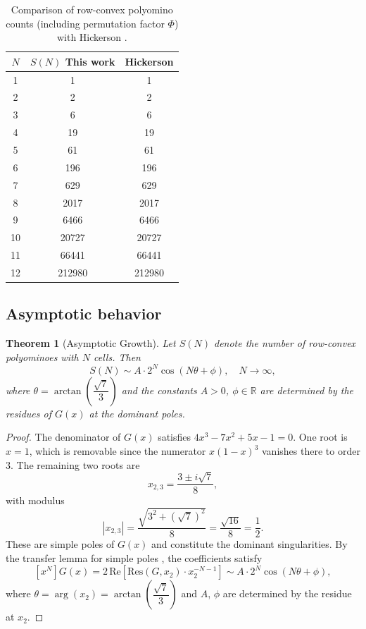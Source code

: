 \documentclass{article}
\theoremstyle{definition}
\theoremstyle{plain}
\newtheorem{theorem}{Theorem}[section]
\begin{document}
\begin{table}[h!]
\centering
\begin{tabular}{c|c|c}
$N$ & $S(N)$ This work & Hickerson \cite{hickerson1999counting} \\
\hline
1  & 1      & 1      \\
2  & 2      & 2      \\
3  & 6      & 6      \\
4  & 19     & 19     \\
5  & 61     & 61     \\
6  & 196    & 196    \\
7  & 629    & 629    \\
8  & 2017   & 2017   \\
9  & 6466   & 6466   \\
10 & 20727  & 20727  \\
11 & 66441  & 66441  \\
12 & 212980 & 212980 \\
\end{tabular}
\caption{Comparison of row-convex polyomino counts (including permutation 
factor $\Phi$) with Hickerson \cite{hickerson1999counting}.}
\label{tab:comparison}
\end{table}

\subsection{Asymptotic behavior}

\begin{theorem}[Asymptotic Growth]
\label{thm:asymptotic}
Let $S(N)$ denote the number of row-convex polyominoes with $N$ cells. 
Then
\[
S(N) \sim A \cdot 2^N \cos(N\theta + \phi), \quad N \to \infty,
\]
where $\theta = \arctan\!\left(\dfrac{\sqrt{7}}{3}\right)$ and the 
constants $A > 0$, $\phi \in \mathbb{R}$ are determined by the residues 
of $G(x)$ at the dominant poles.
\end{theorem}

\begin{proof}
The denominator of $G(x)$ satisfies $4x^3-7x^2+5x-1=0$. One root is 
$x=1$, which is removable since the numerator $x(1-x)^3$ vanishes there 
to order $3$. The remaining two roots are
\[
x_{2,3} = \frac{3 \pm i\sqrt{7}}{8},
\]
with modulus
\[
|x_{2,3}| = \frac{\sqrt{3^2+(\sqrt{7})^2}}{8} = \frac{\sqrt{16}}{8} 
= \frac{1}{2}.
\]
These are simple poles of $G(x)$ and constitute the dominant 
singularities. By the transfer lemma for simple poles 
\cite{flajolet2009analytic}, the coefficients satisfy
\[
[x^N] G(x) = 
2\,\mathrm{Re}\!\left[\mathrm{Res}(G, x_2)\cdot x_2^{-N-1}\right]
\sim A \cdot 2^N \cos(N\theta + \phi),
\]
where $\theta = \arg(x_2) = \arctan\!\left(\dfrac{\sqrt{7}}{3}\right)$ 
and $A$, $\phi$ are determined by the residue at $x_2$.
\end{proof}
\end{document}
